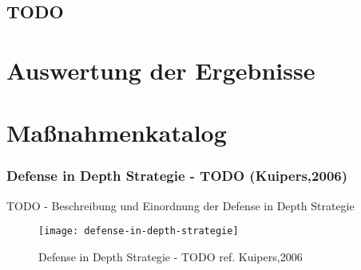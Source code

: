 \subsection{TODO}

\section{Auswertung der Ergebnisse}

\section{Maßnahmenkatalog}
\subsubsection{Defense in Depth Strategie - TODO (Kuipers,2006)}

TODO - Beschreibung und Einordnung der Defense in Depth Strategie

\begin{figure}[h]
    \centering
    \texttt{[image: defense-in-depth-strategie]}
    \caption{Defense in Depth Strategie - TODO ref. Kuipers,2006}
    \label{Kap3:Defense-in-Depth}
\end{figure}

